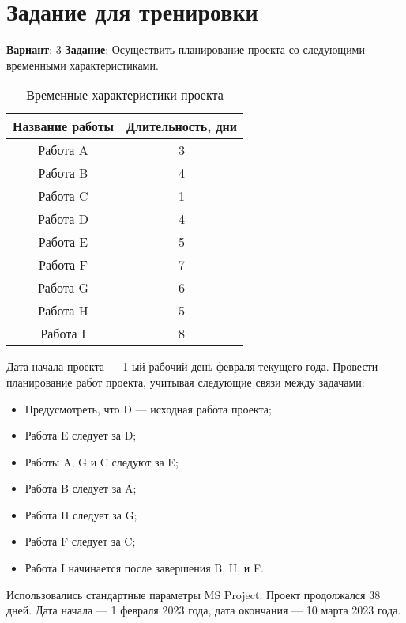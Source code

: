 \chapter{Задание для тренировки}

\textbf{Вариант}: 3
\textbf{Задание}: Осуществить планирование проекта со следующими временными
характеристиками.

\begin{table}[!h]
    \begin{center}
        \caption{Временные характеристики проекта}
        \begin{tabular}{|c|c|}
            \hline
            \bfseries Название работы & \bfseries Длительность, дни \\\hline
            Работа A & 3 \\
            Работа B & 4 \\
            Работа C & 1 \\
            Работа D & 4 \\
            Работа E & 5 \\
            Работа F & 7 \\
            Работа G & 6 \\
            Работа H & 5 \\
            Работа I & 8 \\\hline
        \end{tabular}
    \end{center}
\end{table}

Дата начала проекта --- 1-ый рабочий день февраля текущего года.
Провести планирование работ проекта, учитывая следующие связи между задачами:
\begin{itemize}
\item Предусмотреть, что D --- исходная работа проекта;
\item Работа E следует за D;
\item Работы A, G и C следуют за E;
\item Работа B следует за A;
\item Работа H следует за G;
\item Работа F следует за C;
\item Работа I начинается после завершения B, H, и F.
\end{itemize}

Использовались стандартные параметры MS Project. Проект продолжался 38 дней. Дата начала --- 1 февраля 2023 года, дата окончания --- 10 марта 2023 года.

\clearpage


